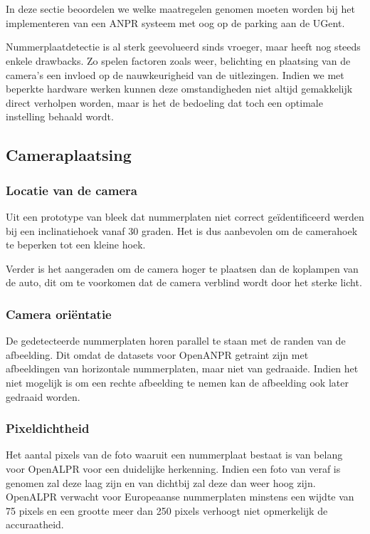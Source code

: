 
\chapter{}
\label{ch:maatregelenanpr}

In deze sectie beoordelen we welke maatregelen genomen moeten worden bij het implementeren van een ANPR systeem met oog op de parking aan de UGent.

Nummerplaatdetectie is al sterk geevolueerd sinds vroeger, maar heeft nog steeds enkele drawbacks. Zo spelen factoren zoals weer, belichting en plaatsing van de camera's een invloed op de nauwkeurigheid van de uitlezingen. Indien we met beperkte hardware werken kunnen deze omstandigheden niet altijd gemakkelijk direct verholpen worden, maar is het de bedoeling dat toch een optimale instelling behaald wordt.

\section{Cameraplaatsing}

\subsection{Locatie van de camera}
Uit een prototype van \textcite{arrieta2019prototype} bleek dat nummerplaten niet correct geïdentificeerd werden bij een inclinatiehoek vanaf 30 graden. Het is dus aanbevolen om de camerahoek te beperken tot een kleine hoek.

Verder is het aangeraden om de camera hoger te plaatsen dan de koplampen van de auto, dit om te voorkomen dat de camera verblind wordt door het sterke licht.

\subsection{Camera oriëntatie}
De gedetecteerde nummerplaten horen parallel te staan met de randen van de afbeelding. Dit omdat de datasets voor OpenANPR getraint zijn met afbeeldingen van horizontale nummerplaten, maar niet van gedraaide. Indien het niet mogelijk is om een rechte afbeelding te nemen kan de afbeelding ook later gedraaid worden.

\subsection{Pixeldichtheid}
Het aantal pixels van de foto waaruit een nummerplaat bestaat is van belang voor OpenALPR voor een duidelijke herkenning. Indien een foto van veraf is genomen zal deze laag zijn en van dichtbij zal deze dan weer hoog zijn. OpenALPR verwacht voor Europeaanse nummerplaten minstens een wijdte van 75 pixels en een grootte meer dan 250 pixels verhoogt niet opmerkelijk de accuraatheid. \autocite{openalprcameraplacement}

